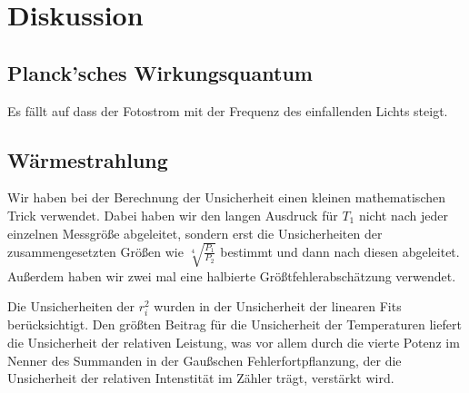 \documentclass[12pt,a4paper,twopage]{article}
\begin{document}
\section{Diskussion}
\subsection{Planck'sches Wirkungsquantum}
Es fällt auf dass der Fotostrom mit der Frequenz des einfallenden Lichts steigt.
\subsection{Wärmestrahlung}
Wir haben bei der Berechnung der Unsicherheit einen kleinen mathematischen Trick verwendet. Dabei haben wir den langen Ausdruck für $T_1$ nicht nach jeder einzelnen Messgröße abgeleitet, sondern erst die Unsicherheiten der zusammengesetzten Größen wie $\sqrt[4]{\frac{P_1}{P_2}}$ bestimmt und dann nach diesen abgeleitet. Außerdem haben wir zwei mal eine halbierte Größtfehlerabschätzung verwendet.   

Die Unsicherheiten der $r_i^2$ wurden in der Unsicherheit der linearen Fits berücksichtigt. Den größten Beitrag für die Unsicherheit der Temperaturen liefert die Unsicherheit der relativen Leistung, was vor allem durch die vierte Potenz im Nenner des Summanden in der Gaußschen Fehlerfortpflanzung, der die Unsicherheit der relativen Intenstität im Zähler trägt, verstärkt wird. \\
																							
\end{document}
